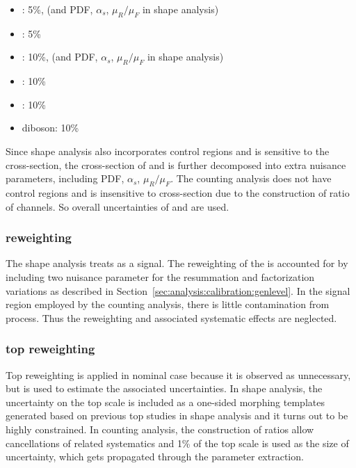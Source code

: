 \begin{itemize}
    \item \ttbar: 5\%, (and PDF, $\alpha_{s}$, $\mu_{R}/\mu_{F}$ in shape analysis)
    \item \tW:    5\%
    \item \zjets: 10\%, (and PDF, $\alpha_{s}$, $\mu_{R}/\mu_{F}$ in shape analysis)
    \item \wjets: 10\%
    \item \gjets: 10\%
    \item diboson: 10\%
\end{itemize}
Since shape analysis also incorporates \zjets control regions and is sensitive to the \ttbar cross-section, the cross-section of \zjets and \ttbar is further decomposed into extra nuisance parameters, including PDF, $\alpha_{s}$, $\mu_{R}/\mu_{F}$. The counting analysis does not have \zjets control regions and is insensitive to \ttbar cross-section due to the construction of ratio of channels. So overall uncertainties of \ttbar and \zjets are used.

\subsubsection{\WW \pt reweighting}
The shape analysis treats \WW as a signal. The reweighting of the \WW \pt is accounted for by including two nuisance parameter for the resummation and factorization variations as described in Section~\ref{sec:analysis:calibration:genlevel}. In the \ttbar signal region employed by the counting analysis, there is little contamination from \WW process. Thus the \WW \pt reweighting and associated systematic effects are neglected.

\subsubsection{top \pt reweighting}
Top \pt reweighting is applied in nominal case because it is observed as unnecessary, but is used to estimate the associated uncertainties. In shape analysis, the uncertainty on the top \pt scale is included as a one-sided morphing templates generated based on previous top studies in shape analysis and it turns out to be highly constrained. In counting analysis, the construction of ratios allow cancellations of \ttbar related systematics and 1\% of the top \pt scale is used as the size of uncertainty, which gets propagated through the parameter extraction.


